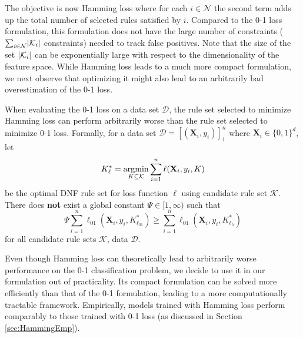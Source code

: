 \documentclass[twoside,11pt]{article}
\begin{document}
The objective is now Hamming loss where for each $i\in \mathcal{N}$ the second term adds up the total number of selected rules satisfied by $i$. Compared to the 0-1 loss formulation, this formulation does not have the large number of constraints ($\sum_{i \in {\cal N}}\lvert{\cal K}_i\rvert$ constraints) needed to track false positives. Note that the size of the set $\lvert{\cal K}_i\rvert$ can be exponentially large with respect to the dimensionality of the feature space. While Hamming loss leads to a much more compact formulation, we next observe that optimizing it might also lead to an arbitrarily bad overestimation of the 0-1 loss.

\begin{theorem} \label{theorem:hamm}
%
When evaluating the 0-1 loss on a data set $\mathcal{D}$, the rule set selected to minimize Hamming loss can perform arbitrarily worse than the rule set selected to minimize 0-1 loss. Formally, for a data set $\mathcal{D} = [(\mathbf{X}_i, y_i)]_1^n$ where $\mathbf{X}_i \in \{0,1\}^d$, let 
$$K^*_{\ell} = \operatorname*{\arg\!\min}_{K \subseteq \mathcal{K}} \sum_{i=1}^{n} \ell(\mathbf{X}_i, y_i, K)$$ be the optimal DNF rule set for loss function $\ell$ using candidate rule set $\mathcal{K}$. 
There does \textbf{not} exist a global constant $\Psi \in [1,\infty)$ such that
$$
\Psi \sum_{i=1}^n \ell_{01}(\mathbf{X}_i, y_i, K^*_{\ell_{01}}) \geq \sum_{i=1}^n \ell_{01}(\mathbf{X}_i, y_i, K^*_{\ell_{h}})
$$
for all candidate rule sets $\mathcal{K}$, data $\mathcal{D}$. 
\end{theorem}


Even though Hamming loss can theoretically lead to arbitrarily worse performance on the 0-1 classification problem, we decide to use it in our formulation out of practicality. Its compact formulation can be solved more efficiently than that of the 0-1 formulation, leading to a more computationally tractable framework. Empirically, models trained with Hamming loss perform comparably to those trained with 0-1 loss (as discussed in Section \ref{sec:HammingEmp}).
\end{document}
